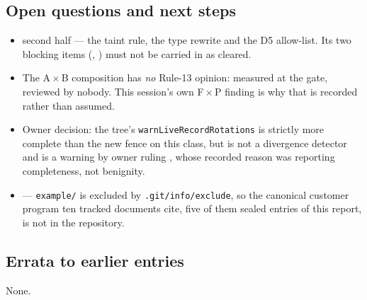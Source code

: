 \subsection*{Open questions and next steps}
\begin{itemize}
  \item {} second half --- the taint rule, the type rewrite and the D5 allow-list. Its
        two blocking items (, ) must not be carried in as cleared.
  \item The A\,$\times$\,B composition has \emph{no} Rule-13 opinion: measured at the gate,
        reviewed by nobody. This session's own F\,$\times$\,P finding is why that is recorded
        rather than assumed.
  \item Owner decision: the tree's \texttt{warnLiveRecordRotations} is strictly more complete
        than the new  fence on this class, but is not a divergence detector and is a
        warning by owner ruling , whose recorded reason was reporting completeness,
        not benignity.
  \item {} --- \texttt{example/} is excluded by \texttt{.git/info/exclude}, so the
        canonical customer program ten tracked documents cite, five of them sealed entries of
        this report, is not in the repository.
\end{itemize}

\subsection*{Errata to earlier entries}
None.
